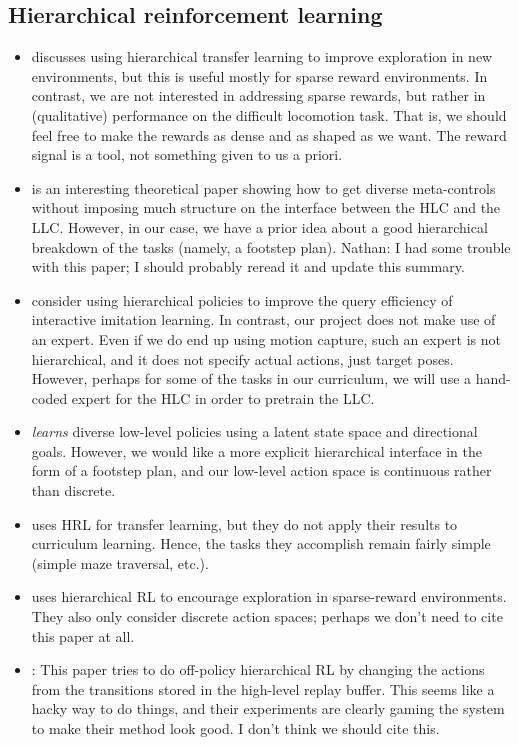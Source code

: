 \documentclass[a4paper]{article}
\newcommand{\nhatch}[1]{{\leavevmode\color{blue} Nathan: #1}}
\begin{document}
\subsection*{Hierarchical reinforcement learning}

\begin{itemize}
  \item \cite{heess2016learning} discusses using hierarchical transfer learning to improve exploration in new environments, but this is useful mostly for sparse reward environments.
    In contrast, we are not interested in addressing sparse rewards, but rather in (qualitative) performance on the difficult locomotion task.
    That is, we should feel free to make the rewards as dense and as shaped as we want.
    The reward signal is a tool, not something given to us a priori.

  \item \cite{hausman2018learning} is an interesting theoretical paper showing how to get diverse meta-controls without imposing much structure on the interface between the HLC and the LLC.
    However, in our case, we have a prior idea about a good hierarchical breakdown of the tasks (namely, a footstep plan).
    \nhatch{I had some trouble with this paper; I should probably reread it and update this summary.}

  \item \cite{daume18ilrl} consider using hierarchical policies to improve the query efficiency of interactive imitation learning.
    In contrast, our project does not make use of an expert.
    Even if we do end up using motion capture, such an expert is not hierarchical, and it does not specify actual actions, just target poses.
    However, perhaps for some of the tasks in our curriculum, we will use a hand-coded expert for the HLC in order to pretrain the LLC.

  \item \cite{vezhnevets2017feudal} \emph{learns} diverse low-level policies using a latent state space and directional goals.
    However, we would like a more explicit hierarchical interface in the form of a footstep plan, and our low-level action space is continuous rather than discrete.

  \item \cite{frans2018meta} uses HRL for transfer learning, but they do not apply their results to curriculum learning.
    Hence, the tasks they accomplish remain fairly simple (simple maze traversal, etc.).

  \item \cite{kulkarni2016hierarchical} uses hierarchical RL to encourage exploration in sparse-reward environments.
    They also only consider discrete action spaces; perhaps we don't need to cite this paper at all.
  \item \cite{nachum2018data}: This paper tries to do off-policy hierarchical RL by changing the actions from the transitions stored in the high-level replay buffer.
    This seems like a hacky way to do things, and their experiments are clearly gaming the system to make their method look good.
    I don't think we should cite this.
\end{itemize}
\end{document}
